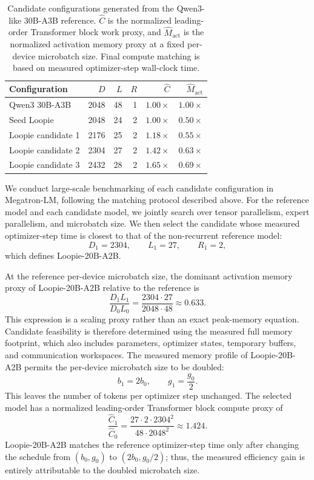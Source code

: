 \begin{table}[t]
    \centering
    \small
    \caption{
    Candidate configurations generated from the Qwen3-like 30B-A3B
    reference. $\widehat{C}$ is the normalized leading-order Transformer block work
    proxy, and $\widehat{M}_{\mathrm{act}}$ is the normalized
    activation memory proxy at a fixed per-device microbatch size.
    Final compute matching is based on measured optimizer-step wall-clock
    time.
    }
    \label{tab:loopie-recipe}
    \begin{tabular}{lrrrrr}
        \toprule
        Configuration
        & $D$
        & $L$
        & $R$
        & $\widehat{C}$
        & $\widehat{M}_{\mathrm{act}}$ \\
        \midrule
        Qwen3 30B-A3B
        & 2048 & 48 & 1 & $1.00\times$ & $1.00\times$ \\
        \midrule
        Seed Loopie
        & 2048 & 24 & 2 & $1.00\times$ & $0.50\times$ \\
        Loopie candidate 1
        & 2176 & 25 & 2 & $1.18\times$ & $0.55\times$ \\
        Loopie candidate 2
        & 2304 & 27 & 2 & $1.42\times$ & $0.63\times$ \\
        Loopie candidate 3
        & 2432 & 28 & 2 & $1.65\times$ & $0.69\times$ \\
        \bottomrule
    \end{tabular}
\end{table}

We conduct large-scale benchmarking of each candidate configuration in Megatron-LM, following the matching protocol described above. For the reference model and each candidate model, we jointly search over tensor parallelism, expert parallelism, and microbatch size. We then select the candidate whose measured optimizer-step time is closest to that of the non-recurrent reference model:
\[
D_1 = 2304,
\qquad
L_1 = 27,
\qquad
R_1 = 2,
\]
which defines Loopie-20B-A2B.

At the reference per-device microbatch size, the dominant
activation memory proxy of Loopie-20B-A2B relative to the reference is
\[
\frac{D_1L_1}{D_0L_0}
=
\frac{2304\cdot 27}{2048\cdot 48}
\approx
0.633.
\]
This expression is a scaling proxy rather than an exact peak-memory
equation. Candidate feasibility is therefore determined using the
measured full memory footprint, which also includes parameters,
optimizer states, temporary buffers, and communication workspaces. The
measured memory profile of Loopie-20B-A2B permits the per-device
microbatch size to be doubled:
\[
b_{1}
=
2b_{0},
\qquad
g_1
=
\frac{g_0}{2}.
\]
This leaves the number of tokens per optimizer step unchanged. The selected model has a normalized leading-order Transformer block compute proxy of
\[
\frac{\widehat{C}_1}{\widehat{C}_0}
=
\frac{
27\cdot 2\cdot 2304^2
}{
48\cdot 2048^2
}
\approx
1.424.
\]
Loopie-20B-A2B matches the reference optimizer-step time only after
changing the schedule from $(b_0, g_0)$ to $(2b_0, g_0/2)$; thus, the measured efficiency gain is entirely attributable to the doubled
microbatch size.

